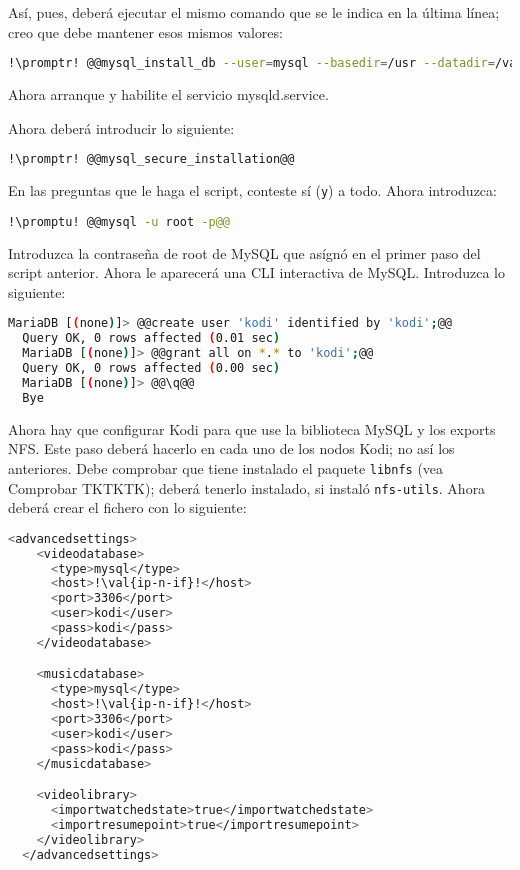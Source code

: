 \noindent Así, pues, deberá ejecutar el mismo comando que se le indica en la última línea; creo que debe
mantener esos mismos valores:

\begin{lstlisting}[gobble=2,language=bash,style=bashinteract,escapechar=!]
  !\promptr! @@mysql_install_db --user=mysql --basedir=/usr --datadir=/var/lib/mysql@@
\end{lstlisting}

Ahora arranque y habilite el servicio mysqld.service.

Ahora deberá introducir lo siguiente:

\begin{lstlisting}[gobble=2,language=bash,style=bashinteract,escapechar=!]
  !\promptr! @@mysql_secure_installation@@
\end{lstlisting}

\noindent En las preguntas que le haga el script, conteste sí (\lstinline!y!) a todo. Ahora introduzca:

\begin{lstlisting}[gobble=2,language=bash,style=bashinteract,escapechar=!]
  !\promptu! @@mysql -u root -p@@
\end{lstlisting}

\noindent Introduzca la contraseña de root de MySQL que asígnó en el primer paso del script anterior. Ahora le
aparecerá una CLI interactiva de MySQL. Introduzca lo siguiente:

\begin{lstlisting}[gobble=2,language=bash,style=bashinteract,escapechar=!]
  MariaDB [(none)]> @@create user 'kodi' identified by 'kodi';@@
  Query OK, 0 rows affected (0.01 sec)
  MariaDB [(none)]> @@grant all on *.* to 'kodi';@@
  Query OK, 0 rows affected (0.00 sec)
  MariaDB [(none)]> @@\q@@
  Bye
\end{lstlisting}

Ahora hay que configurar Kodi para que use la biblioteca MySQL y los exports NFS. Este paso deberá hacerlo en
cada uno de los nodos Kodi; no así los anteriores. Debe comprobar que tiene instalado el paquete
\lstinline+libnfs+ (vea Comprobar TKTKTK); deberá tenerlo instalado, si instaló \lstinline+nfs-utils+. Ahora
deberá crear el fichero  con lo siguiente:

\begin{lstlisting}[gobble=2,language=bash,style=bashinteract,escapechar=!]
  <advancedsettings>
    <videodatabase>
      <type>mysql</type>
      <host>!\val{ip-n-if}!</host>
      <port>3306</port>
      <user>kodi</user>
      <pass>kodi</pass>
    </videodatabase>

    <musicdatabase>
      <type>mysql</type>
      <host>!\val{ip-n-if}!</host>
      <port>3306</port>
      <user>kodi</user>
      <pass>kodi</pass>
    </musicdatabase>

    <videolibrary>
      <importwatchedstate>true</importwatchedstate>
      <importresumepoint>true</importresumepoint>
    </videolibrary>
  </advancedsettings>
\end{lstlisting}

